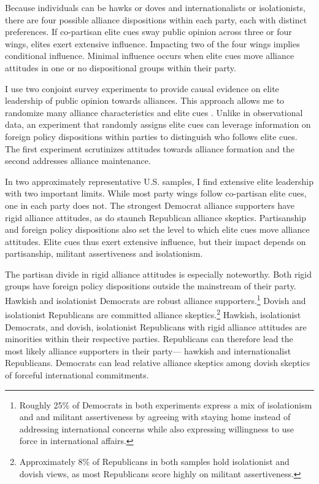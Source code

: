 \documentclass[12pt]{article}
\begin{document}
Because individuals can be hawks or doves and internationalists or isolationists, there are four possible alliance dispositions within each party, each with distinct preferences. 
If co-partisan elite cues sway public opinion across three or four wings, elites exert extensive influence. 
Impacting two of the four wings implies conditional influence. 
Minimal influence occurs when elite cues move alliance attitudes in one or no dispositional groups within their party.


I use two conjoint survey experiments to provide causal evidence on elite leadership of public opinion towards alliances.
This approach allows me to randomize many alliance characteristics and elite cues \citep{Hainmuelleretal2014}.
Unlike in observational data, an experiment that randomly assigns elite cues can leverage information on foreign policy dispositions within parties to distinguish who follows elite cues. 
The first experiment scrutinizes attitudes towards alliance formation and the second addresses alliance maintenance. 


In two approximately representative U.S. samples, I find extensive elite leadership with two important limits.
While most party wings follow co-partisan elite cues, one in each party does not.
The strongest Democrat alliance supporters have rigid alliance attitudes, as do staunch Republican alliance skeptics. 
Partisanship and foreign policy dispositions also set the level to which elite cues move alliance attitudes.
Elite cues thus exert extensive influence, but their impact depends on partisanship, militant assertiveness and isolationism.


The partisan divide in rigid alliance attitudes is especially noteworthy.
Both rigid groups have foreign policy dispositions outside the mainstream of their party. 
Hawkish and isolationist Democrats are robust alliance supporters.\footnote{Roughly 25\% of Democrats in both experiments express a mix of isolationism and and militant assertiveness by agreeing with staying home instead of addressing international concerns while also expressing willingness to use force in international affairs.}
Dovish and isolationist Republicans are committed alliance skeptics.\footnote{Approximately 8\% of Republicans in both samples hold isolationist and dovish views, as most Republicans score highly on militant assertiveness.} 
Hawkish, isolationist Democrats, and dovish, isolationist Republicans with rigid alliance attitudes are minorities within their respective parties. 
Republicans can therefore lead the most likely alliance supporters in their party--- hawkish and internationalist Republicans.
Democrats can lead relative alliance skeptics among dovish skeptics of forceful international commitments.
\end{document}
